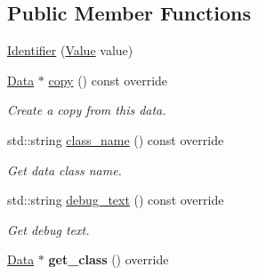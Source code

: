 \subsection*{Public Member Functions}
\begin{DoxyCompactItemize}
\item 
\hyperlink{classcreek_1_1_identifier_ad321d6c4aaaab21e47923df14a0dea60}{Identifier} (\hyperlink{classcreek_1_1_identifier_afb560a4cce99e96c30092edbd22a5ef4}{Value} value)
\item 
\hyperlink{classcreek_1_1_data}{Data} $\ast$ \hyperlink{classcreek_1_1_identifier_af2c631358aa94cd62eadf15afff6e40c}{copy} () const  override\hypertarget{classcreek_1_1_identifier_af2c631358aa94cd62eadf15afff6e40c}{}\label{classcreek_1_1_identifier_af2c631358aa94cd62eadf15afff6e40c}

\begin{DoxyCompactList}\small\item\em Create a copy from this data. \end{DoxyCompactList}\item 
std\+::string \hyperlink{classcreek_1_1_identifier_a848f599e0093b85bc364db50e5d234dd}{class\+\_\+name} () const  override\hypertarget{classcreek_1_1_identifier_a848f599e0093b85bc364db50e5d234dd}{}\label{classcreek_1_1_identifier_a848f599e0093b85bc364db50e5d234dd}

\begin{DoxyCompactList}\small\item\em Get data class name. \end{DoxyCompactList}\item 
std\+::string \hyperlink{classcreek_1_1_identifier_a30bee250de22c4627fed84c0518b06d0}{debug\+\_\+text} () const  override\hypertarget{classcreek_1_1_identifier_a30bee250de22c4627fed84c0518b06d0}{}\label{classcreek_1_1_identifier_a30bee250de22c4627fed84c0518b06d0}

\begin{DoxyCompactList}\small\item\em Get debug text. \end{DoxyCompactList}\item 
\hyperlink{classcreek_1_1_data}{Data} $\ast$ {\bfseries get\+\_\+class} () override\hypertarget{classcreek_1_1_identifier_a9a7426d60a134337200891b8763492f3}{}\label{classcreek_1_1_identifier_a9a7426d60a134337200891b8763492f3}

\end{DoxyCompactItemize}
